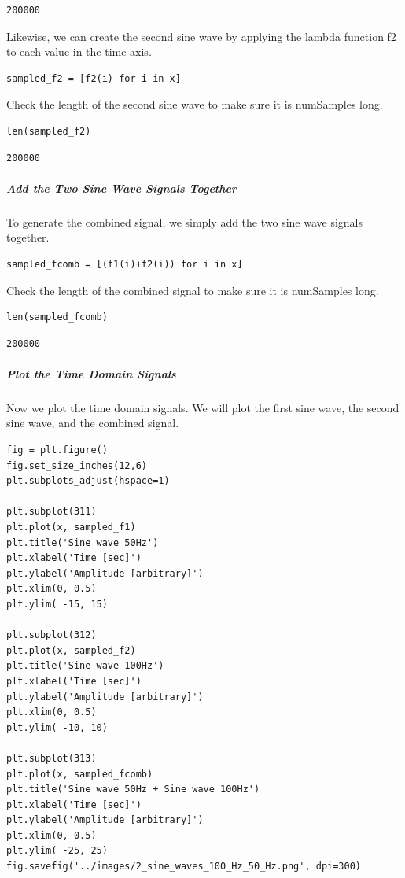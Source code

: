 \begin{verbatim}
200000
\end{verbatim}

Likewise, we can create the second sine wave by applying the lambda function f2 to each value in the time axis.

\begin{verbatim}
sampled_f2 = [f2(i) for i in x]
\end{verbatim}

Check the length of the second sine wave to make sure it is numSamples long.

\begin{verbatim}
len(sampled_f2)
\end{verbatim}

\begin{verbatim}
200000
\end{verbatim}

\subparagraph{Add the Two Sine Wave Signals Together}

To generate the combined signal, we simply add the two sine wave signals together.

\begin{verbatim}
sampled_fcomb = [(f1(i)+f2(i)) for i in x]
\end{verbatim}

Check the length of the combined signal to make sure it is numSamples long.

\begin{verbatim}
len(sampled_fcomb)
\end{verbatim}

\begin{verbatim}
200000
\end{verbatim}

\subparagraph{Plot the Time Domain Signals}

Now we plot the time domain signals.  We will plot the first sine wave, the second sine wave, and the combined signal.

\begin{verbatim}
fig = plt.figure()
fig.set_size_inches(12,6)
plt.subplots_adjust(hspace=1)

plt.subplot(311)
plt.plot(x, sampled_f1)
plt.title('Sine wave 50Hz')
plt.xlabel('Time [sec]')
plt.ylabel('Amplitude [arbitrary]')
plt.xlim(0, 0.5)
plt.ylim( -15, 15)

plt.subplot(312)
plt.plot(x, sampled_f2)
plt.title('Sine wave 100Hz')
plt.xlabel('Time [sec]')
plt.ylabel('Amplitude [arbitrary]')
plt.xlim(0, 0.5)
plt.ylim( -10, 10)

plt.subplot(313)
plt.plot(x, sampled_fcomb)
plt.title('Sine wave 50Hz + Sine wave 100Hz')
plt.xlabel('Time [sec]')
plt.ylabel('Amplitude [arbitrary]')
plt.xlim(0, 0.5)
plt.ylim( -25, 25)
fig.savefig('../images/2_sine_waves_100_Hz_50_Hz.png', dpi=300)
\end{verbatim}

